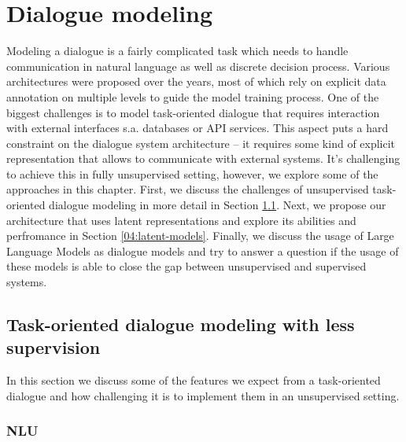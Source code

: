 \chapter{Dialogue modeling}%
\label{chap:modeling}
Modeling a dialogue is a fairly complicated task which needs to handle communication in natural language as well as  discrete decision process.
Various architectures were proposed over the years, most of which rely on explicit data annotation on multiple levels to guide the model training process.
One of the biggest challenges is to model task-oriented dialogue that requires interaction with external interfaces s.a. databases or API services.
This aspect puts a hard constraint on the dialogue system architecture -- it requires some kind of explicit representation that allows to communicate with external systems.
It's challenging to achieve this in fully unsupervised setting, however, we explore some of the approaches in this chapter.
First, we discuss the challenges of unsupervised task-oriented dialogue modeling in more detail in Section \ref{04:to-unsup}.
Next, we propose our architecture that uses latent representations and explore its abilities and perfromance in Section \ref{04:latent-models}.
Finally, we discuss the usage of Large Language Models as dialogue models and try to answer a question if the usage of these models is able to close the gap between unsupervised and supervised systems.

\section{Task-oriented dialogue modeling with less supervision}
\label{04:to-unsup}
In this section we discuss some of the features we expect from a task-oriented dialogue and how challenging it is to implement them in an unsupervised setting.

\subsection{NLU}
